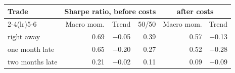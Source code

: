 \begin{tabular}{l rrr rr}
\toprule
Trade & \multicolumn{3}{c}{Sharpe ratio, before costs} & \multicolumn{2}{c}{after costs} \\
\cmidrule(lr){2-4}\cmidrule(lr){5-6}
 & Macro mom. & Trend & 50/50 & Macro mom. & Trend \\
\midrule
right away & 0.69 & $-$0.05 & 0.39 & 0.57 & $-$0.13 \\
one month late & 0.65 & $-$0.20 & 0.27 & 0.52 & $-$0.28 \\
two months late & 0.21 & $-$0.02 & 0.11 & 0.09 & $-$0.09 \\
\bottomrule
\end{tabular}
